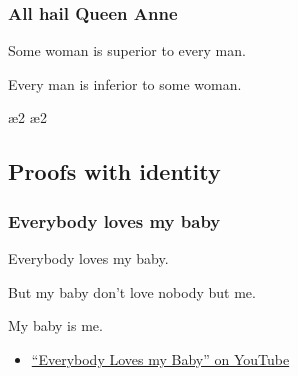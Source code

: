 \begin{frame}
    \frametitle{All hail Queen Anne}

\begin{earg}
\item[] Some woman is superior to every man.
\item[\therefore] Every man is inferior to some woman.
\end{earg}

\bigskip

\begin{fitchproof}
\end{fitchproof}
\end{frame}

\begin{frame}\footnotesize

\begin{fitchproof}
\open
{}
\open
{}
\ae{2}
\ae{2}
\close
{}
\close
{}
\end{fitchproof}
\end{frame}

\subsection{Proofs with identity}

\begin{frame}
    \frametitle{Everybody loves my baby}


\begin{earg}
\item[] Everybody loves my baby.
\item[] But my baby don't love nobody but me.
\item[\therefore] My baby is me.
\end{earg}

\bigskip

\begin{fitchproof}
\end{fitchproof}

\small\begin{itemize}
\item
\href{https://www.youtube.com/results?search_query=\%22Everybody+loves+my+baby\%22}{``Everybody
Loves my Baby'' on YouTube}
\end{itemize}

\end{frame}

